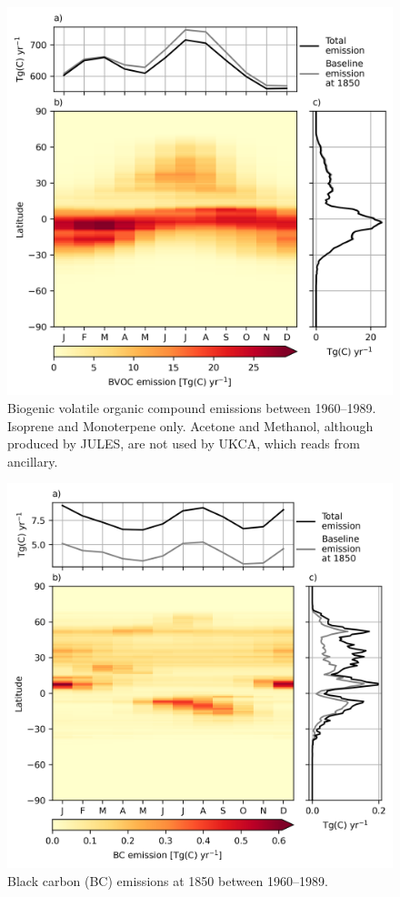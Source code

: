 \begin{figure}
    \centering
    \includegraphics{Appendix1/figs/emibvoc_monthly_pothole.png}
    \caption[Biogenic volatile organic compound emissions between 1960--1989]{Biogenic volatile organic compound emissions between 1960--1989. Isoprene and Monoterpene only. Acetone and Methanol, although produced by JULES, are not used by UKCA, which reads from ancillary.}
    \label{fig:app1:seasonal-emibvoc-pothole}
\end{figure}

\begin{figure}
    \centering
    \includegraphics{Appendix1/figs/emibc_monthly_pothole.png}
    \caption{Black carbon (BC) emissions at 1850 between 1960--1989.}
    \label{fig:app1:seasonal-emibc-pothole}
\end{figure}

